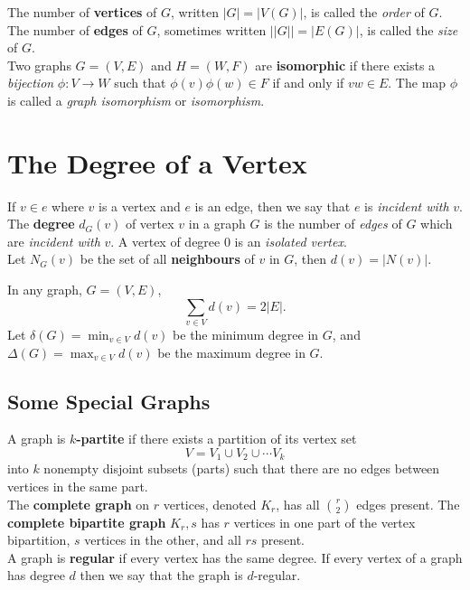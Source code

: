 The number of \textbf{vertices} of \(G\), written \(|G| = |V(G)|\), is called the \textit{order} of \(G\). The number of \textbf{edges} of \(G\), sometimes written \(||G|| = |E(G)|\), is called the \textit{size} of \(G\). \\

Two graphs \(G = (V, E)\) and \(H = (W, F)\) are \textbf{isomorphic} if there exists a \textit{bijection} \(\phi: V \to W\) such that \(\phi(v)\phi(w) \in F\) if and only if \(vw \in E\). The map \(\phi\) is called a \textit{graph isomorphism} or \textit{isomorphism}.

\section{The Degree of a Vertex}
If \(v \in e\) where \(v\) is a vertex and \(e\) is an edge, then we say that \(e\) is \textit{incident with} \(v\). The \textbf{degree} \(d_G(v)\) of vertex \(v\) in a graph \(G\) is the number of \textit{edges} of \(G\) which are \textit{incident with} \(v\). A vertex of degree 0 is an \textit{isolated vertex}. \\

Let \(N_G(v)\) be the set of all \textbf{neighbours} of \(v\) in \(G\), then \(d(v) = |N(v)|.\)

\begin{lemma}
    In any graph, \(G = (V, E)\),
    \[\sum_{v \in V} d(v) = 2|E|.\]
    Let \(\delta(G) = \min_{v \in V}d(v)\) be the minimum degree in \(G\), and \(\Delta(G) = \max_{v \in V} d(v)\) be the maximum degree in \(G\).
\end{lemma}

\subsection{Some Special Graphs}
A graph is \textbf{\(k\)-partite} if there exists a partition of its vertex set
\[V = V_1 \cup V_2 \cup \cdots V_k\]
into \(k\) nonempty disjoint subsets (parts) such that there are no edges between vertices in the same part. \\

The \textbf{complete graph} on \(r\) vertices, denoted \(K_r\), has all \(\binom{r}{2}\) edges present. The \textbf{complete bipartite graph} \(K_r, s\) has \(r\) vertices in one part of the vertex bipartition, \(s\) vertices in the other, and all \(rs\) present. \\

A graph is \textbf{regular} if every vertex has the same degree. If every vertex of a graph has degree \(d\) then we say that the graph is \(d\)-regular. \\

